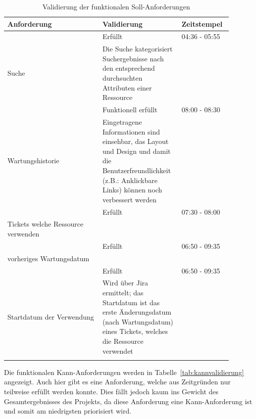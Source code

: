 \begin{longtable}{| P{0.4\linewidth} | P{0.3\linewidth} | P{0.2\linewidth} |} 
  \hline
  \textbf{Anforderung} & \textbf{Validierung} & \textbf{Zeitstempel}\\ [0.5ex] 
  \hline
  
   & Erfüllt & 04:36 - 05:55 \\
  Suche & Die Suche kategorisiert Suchergebnisse nach den entsprechend durchsuchten Attributen einer Ressource & \\ [0.5ex] \hline

   & Funktionell erfüllt & 08:00 - 08:30 \\
  Wartungshistorie & Eingetragene Informationen sind einsehbar, das Layout und Design und damit die Benutzerfreundlichkeit (z.B.: Anklickbare Links) können noch verbessert werden & \\ [0.5ex] \hline

   & Erfüllt & 07:30 - 08:00 \\
  Tickets welche Ressource verwenden & & \\ [0.5ex] \hline

   & Erfüllt & 06:50 - 09:35 \\
  vorheriges Wartungsdatum & & \\ [0.5ex] \hline

   & Erfüllt & 06:50 - 09:35 \\
  Startdatum der Verwendung & Wird über \gls{Jira} ermittelt; das Startdatum ist das erste Änderungsdatum (nach Wartungsdatum) eines Tickets, welches die Ressource verwendet & \\ [0.5ex] \hline

  \caption{Validierung der funktionalen Soll-Anforderungen}\label{tab:sollvalidierung}
\end{longtable}

\newpage

Die funktionalen Kann-Anforderungen werden in Tabelle~\ref{tab:kannvalidierung} angezeigt.
Auch hier gibt es eine Anforderung, welche aus Zeitgründen nur teilweise erfüllt werden konnte.
Dies fällt jedoch kaum ins Gewicht des Gesamtergebnisses des Projekts, da diese Anforderung 
eine Kann-Anforderung ist und somit am niedrigsten priorisiert wird.

